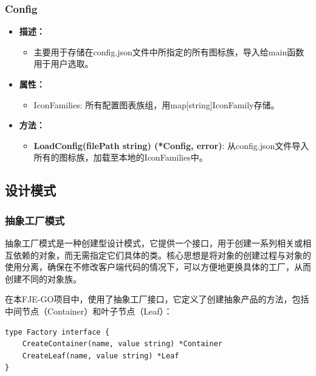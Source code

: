 \documentclass[hyperref,a4paper,UTF8]{ctexart}
\begin{document}
\subsubsection{Config}
\begin{itemize}
    \item \textbf{描述：}
    \begin{itemize}
        \item 主要用于存储在config.json文件中所指定的所有图标族，导入给main函数用于用户选取。
    \end{itemize}
    \item \textbf{属性：}
    \begin{itemize}
        \item IconFamilies: 所有配置图表族组，用map[string]IconFamily存储。
    \end{itemize}
    \item \textbf{方法：}
    \begin{itemize}
        \item \textbf{LoadConfig(filePath string) (*Config, error)}: 从config.json文件导入所有的图标族，加载至本地的IconFamilies中。
    \end{itemize}
\end{itemize}















\subsection{设计模式}
\subsubsection{抽象工厂模式}\label{sec:abs}
抽象工厂模式是一种创建型设计模式，它提供一个接口，用于创建一系列相关或相互依赖的对象，而无需指定它们具体的类。核心思想是将对象的创建过程与对象的使用分离，确保在不修改客户端代码的情况下，可以方便地更换具体的工厂，从而创建不同的对象族。

在本FJE-GO项目中，使用了抽象工厂接口，它定义了创建抽象产品的方法，包括中间节点（Container）和叶子节点（Leaf）：
\begin{lstlisting}
type Factory interface {
    CreateContainer(name, value string) *Container
    CreateLeaf(name, value string) *Leaf
}
\end{lstlisting}
\end{document}
